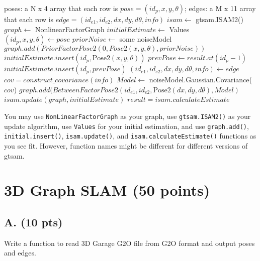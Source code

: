 \documentclass[tp]{lcc}
\begin{document}
\begin{algorithmic}[1]
\Require poses: a N x 4 array that each row is $pose=(id_{p},x,y,\theta)$; edges: a M x 11 array that each row is $edge=(id_{e1},id_{e2},dx,dy,d\theta,info)$
\State $isam \leftarrow$ gtsam.ISAM2() 
    \State $graph \leftarrow$ NonlinearFactorGraph 
    \State $initialEstimate \leftarrow$ Values 
    \State $(id_{p},x,y,\theta) \gets pose$ 
        \State $priorNoise \leftarrow$ some noiseModel 
        \State $graph.add(PriorFactorPose2(0,Pose2(x,y,\theta),priorNoise))$
        \State $initialEstimate.insert(id_{p},\text{Pose2}(x,y,\theta))$
    \Else {}
        \State $prevPose \gets result.at(id_{p}-1)$ 
        \State $initialEstimate.insert(id_{p},prevPose)$
    \EndIf
        \State $(id_{e1},id_{e2},dx,dy,d\theta,info) \gets edge$ 
            \State $cov=construct\_covariance(info)$ 
            \State $Model \leftarrow$ noiseModel.Gaussian.Covariance($cov$)
            \State $graph.add(BetweenFactorPose2(id_{e1},id_{e2},\text{Pose2}(dx,dy,d\theta),Model)$
        \EndIf
    \EndFor
    \State $isam.update(graph,initialEstimate)$
    \State $result=isam.calculateEstimate$
\EndFor
\end{algorithmic}

You may use \texttt{NonLinearFactorGraph} as your graph, use \texttt{gtsam.ISAM2()} as your update algorithm, use \texttt{Values} for your initial estimation, and use \texttt{graph.add()}, \texttt{initial.insert()}, \texttt{isam.update()}, and \texttt{isam.calculateEstimate()} functions as you see fit. However, function names might be different for different versions of gtsam.

\section{3D Graph SLAM (50 points)}
\subsection{A. (10 pts)}
Write a function to read 3D Garage G2O file from G2O format and output poses and edges.
\end{document}
